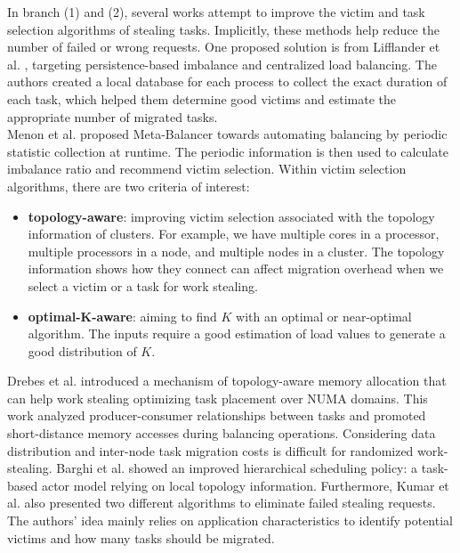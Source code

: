 In branch (1) and (2), several works attempt to improve the victim and task selection algorithms of stealing tasks. Implicitly, these methods help reduce the number of failed or wrong requests. One proposed solution is from Lifflander et al. \cite{lifflander2012work}, targeting persistence-based imbalance and centralized load balancing. The authors created a local database for each process to collect the exact duration of each task, which helped them determine good victims and estimate the appropriate number of migrated tasks.\\

Menon et al. \cite{menon2012automated} proposed Meta-Balancer towards automating balancing by periodic statistic collection at runtime. The periodic information is then used to calculate imbalance ratio and recommend victim selection. Within victim selection algorithms, there are two criteria of interest:
\begin{itemize}
	\item \textbf{topology-aware}: improving victim selection associated with the topology information of clusters. For example, we have multiple cores in a processor, multiple processors in a node, and multiple nodes in a cluster. The topology information shows how they connect can affect migration overhead when we select a victim or a task for work stealing.
	\item \textbf{optimal-K-aware}: aiming to find $K$ with an optimal or near-optimal algorithm. The inputs require a good estimation of load values to generate a good distribution of $K$.
\end{itemize}

Drebes et al. \cite{drebes2014topology} introduced a mechanism of topology-aware memory allocation that can help work stealing optimizing task placement over NUMA domains. This work analyzed producer-consumer relationships between tasks and promoted short-distance memory accesses during balancing operations. Considering data distribution and inter-node task migration costs is difficult for randomized work-stealing. Barghi et al. \cite{barghi2018work} showed an improved hierarchical scheduling policy: a task-based actor model relying on local topology information. Furthermore, Kumar et al. \cite{kumar2016optimized} also presented two different algorithms to eliminate failed stealing requests. The authors' idea mainly relies on application characteristics to identify potential victims and how many tasks should be migrated.\\

